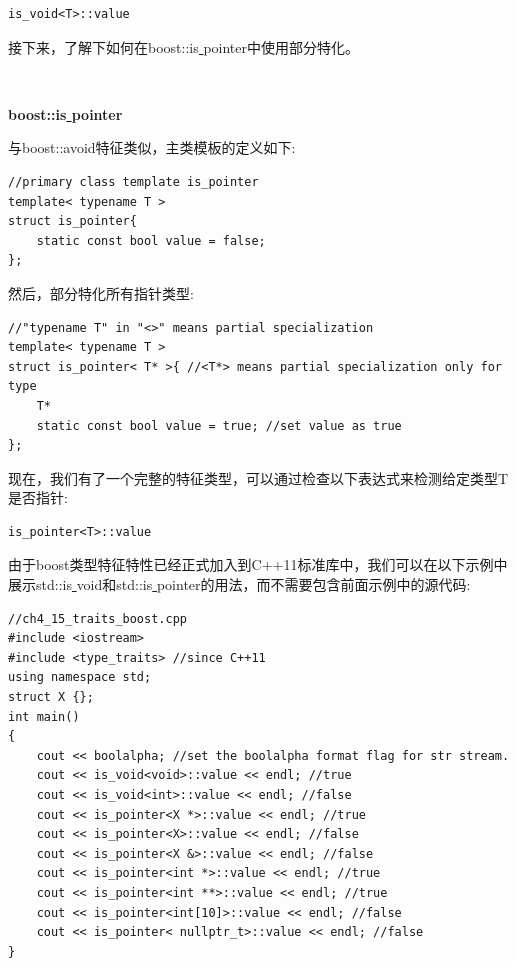 \begin{lstlisting}[caption={}]
is_void<T>::value
\end{lstlisting}

接下来，了解下如何在boost::is\underline{ }pointer中使用部分特化。 \par

\noindent\textbf{}\ \par
\textbf{boost::is\underline{ }pointer} \ \par
与boost::avoid特征类似，主类模板的定义如下:\par

\begin{lstlisting}[caption={}]
//primary class template is_pointer
template< typename T >
struct is_pointer{
	static const bool value = false;
};
\end{lstlisting}

然后，部分特化所有指针类型: \par

\begin{lstlisting}[caption={}]
//"typename T" in "<>" means partial specialization
template< typename T >
struct is_pointer< T* >{ //<T*> means partial specialization only for type
	T*
	static const bool value = true; //set value as true
};
\end{lstlisting}

现在，我们有了一个完整的特征类型，可以通过检查以下表达式来检测给定类型T是否指针: \par

\begin{lstlisting}[caption={}]
is_pointer<T>::value
\end{lstlisting}

由于boost类型特征特性已经正式加入到C++11标准库中，我们可以在以下示例中展示std::is\underline{ }void和std::is\underline{ }pointer的用法，而不需要包含前面示例中的源代码: \par

\begin{lstlisting}[caption={}]
//ch4_15_traits_boost.cpp
#include <iostream>
#include <type_traits> //since C++11
using namespace std;
struct X {};
int main()
{
	cout << boolalpha; //set the boolalpha format flag for str stream.
	cout << is_void<void>::value << endl; //true
	cout << is_void<int>::value << endl; //false
	cout << is_pointer<X *>::value << endl; //true
	cout << is_pointer<X>::value << endl; //false
	cout << is_pointer<X &>::value << endl; //false
	cout << is_pointer<int *>::value << endl; //true
	cout << is_pointer<int **>::value << endl; //true
	cout << is_pointer<int[10]>::value << endl; //false
	cout << is_pointer< nullptr_t>::value << endl; //false
}
\end{lstlisting}

